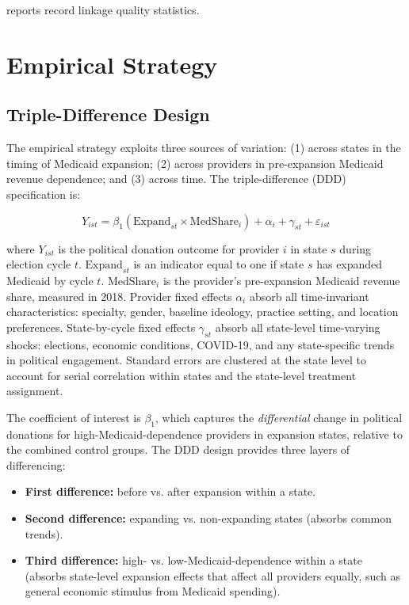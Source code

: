 \documentclass[12pt]{article}
\begin{document}


 reports record linkage quality statistics.




\section{Empirical Strategy}\label{sec:strategy}

\subsection{Triple-Difference Design}

The empirical strategy exploits three sources of variation: (1) across states in the timing of Medicaid expansion; (2) across providers in pre-expansion Medicaid revenue dependence; and (3) across time. The triple-difference (DDD) specification is:

\begin{equation}\label{eq:ddd}
    Y_{ist} = \beta_1 (\text{Expand}_{st} \times \text{MedShare}_i) + \alpha_i + \gamma_{st} + \varepsilon_{ist}
\end{equation}

\noindent where $Y_{ist}$ is the political donation outcome for provider $i$ in state $s$ during election cycle $t$. $\text{Expand}_{st}$ is an indicator equal to one if state $s$ has expanded Medicaid by cycle $t$. $\text{MedShare}_i$ is the provider's pre-expansion Medicaid revenue share, measured in 2018. Provider fixed effects $\alpha_i$ absorb all time-invariant characteristics: specialty, gender, baseline ideology, practice setting, and location preferences. State-by-cycle fixed effects $\gamma_{st}$ absorb all state-level time-varying shocks: elections, economic conditions, COVID-19, and any state-specific trends in political engagement. Standard errors are clustered at the state level to account for serial correlation within states and the state-level treatment assignment.

The coefficient of interest is $\beta_1$, which captures the \textit{differential} change in political donations for high-Medicaid-dependence providers in expansion states, relative to the combined control groups. The DDD design provides three layers of differencing:

\begin{itemize}
    \item \textbf{First difference:} before vs. after expansion within a state.
    \item \textbf{Second difference:} expanding vs. non-expanding states (absorbs common trends).
    \item \textbf{Third difference:} high- vs. low-Medicaid-dependence within a state (absorbs state-level expansion effects that affect all providers equally, such as general economic stimulus from Medicaid spending).
\end{itemize}
\end{document}
